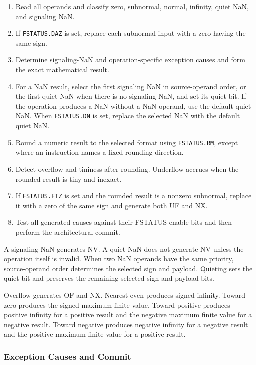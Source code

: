 \begin{enumerate}
\item Read all operands and classify zero, subnormal, normal, infinity, quiet NaN, and signaling NaN.
\item If \texttt{FSTATUS.DAZ} is set, replace each subnormal input with a zero having the same sign.
\item Determine signaling-NaN and operation-specific exception causes and form the exact mathematical result.
\item For a NaN result, select the first signaling NaN in source-operand order, or the first quiet NaN when there is
no signaling NaN, and set its quiet bit. If the operation produces a NaN without a NaN operand, use the default
quiet NaN. When \texttt{FSTATUS.DN} is set, replace the selected NaN with the default quiet NaN.
\item Round a numeric result to the selected format using \texttt{FSTATUS.RM}, except where an instruction names a
fixed rounding direction.
\item Detect overflow and tininess after rounding. Underflow accrues when the rounded result is tiny and inexact.
\item If \texttt{FSTATUS.FTZ} is set and the rounded result is a nonzero subnormal, replace it with a zero of the
same sign and generate both UF and NX.
\item Test all generated causes against their FSTATUS enable bits and then perform the architectural commit.
\end{enumerate}

A signaling NaN generates NV. A quiet NaN does not generate NV unless the operation itself is invalid. When two
NaN operands have the same priority, source-operand order determines the selected sign and payload. Quieting sets
the quiet bit and preserves the remaining selected sign and payload bits.

Overflow generates OF and NX. Nearest-even produces signed infinity. Toward zero produces the signed maximum finite
value. Toward positive produces positive infinity for a positive result and the negative maximum finite value for a
negative result. Toward negative produces negative infinity for a negative result and the positive maximum finite
value for a positive result.

\subsubsection{Exception Causes and Commit}

